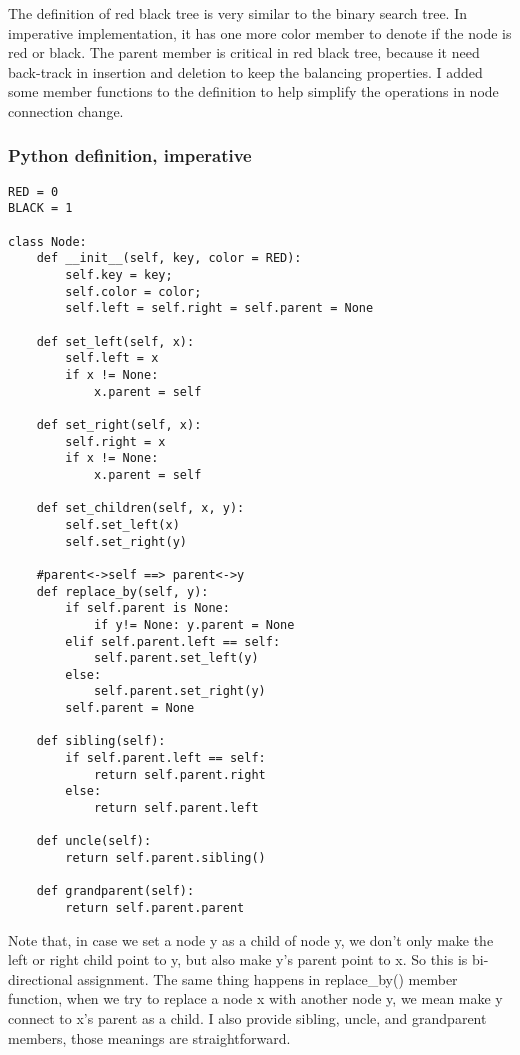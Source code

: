 \documentclass{article}
\begin{document}
The definition of red black tree is very similar to the binary search tree.
In imperative implementation, it has one more color member to denote if the node is red or black. The parent member is critical in red black tree, because
it need back-track in insertion and deletion to keep the balancing properties.
I added some member functions to the definition to help simplify the operations
in node connection change.

\subsubsection*{Python definition, imperative}
\lstset{language=python}
\begin{lstlisting}
RED = 0
BLACK = 1

class Node:
    def __init__(self, key, color = RED):
        self.key = key;
        self.color = color;
        self.left = self.right = self.parent = None

    def set_left(self, x):
        self.left = x
        if x != None:
            x.parent = self

    def set_right(self, x):
        self.right = x
        if x != None:
            x.parent = self

    def set_children(self, x, y):
        self.set_left(x)
        self.set_right(y)

    #parent<->self ==> parent<->y
    def replace_by(self, y):    
        if self.parent is None:
            if y!= None: y.parent = None
        elif self.parent.left == self:
            self.parent.set_left(y)
        else:
            self.parent.set_right(y)
        self.parent = None

    def sibling(self):
        if self.parent.left == self:
            return self.parent.right
        else:
            return self.parent.left

    def uncle(self):
        return self.parent.sibling()

    def grandparent(self):
        return self.parent.parent
\end{lstlisting}

Note that, in case we set a node y as a child of node y, we don't only
make the left or right child point to y, but also make y's parent point to x.
So this is bi-directional assignment. The same thing happens in replace\_by()
member function, when we try to replace a node x with another node y, we
mean make y connect to x's parent as a child. I also provide sibling, uncle,
and grandparent members, those meanings are straightforward.
\end{document}
